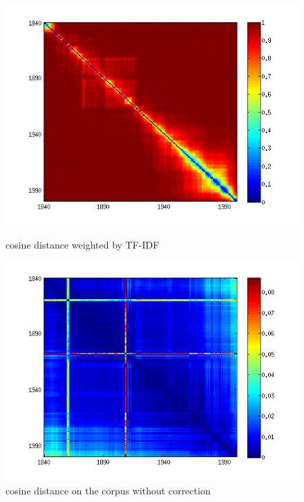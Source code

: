 \begin{figure}[H]
    \begin{minipage}[b]{0.48\linewidth}
        \includegraphics[scale=0.3]{Pictures/cos/cos_corrected_tfidf.jpg}
        \caption{cosine distance weighted by TF-IDF}
        \label{cos_tfidf}
    \end{minipage}\hfill
    \begin{minipage}[b]{0.48\linewidth}
        \includegraphics[scale=0.3]{Pictures/cos/cos_wo_corr.jpg}
        \caption{cosine distance on the corpus without correction}
        \label{cos_wo_corr}
    \end{minipage}\hfill
\end{figure}

